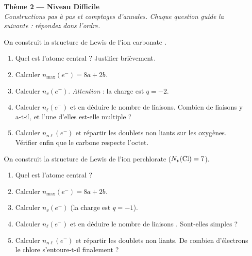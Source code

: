 \documentclass[11pt,a4paper]{article}
\newcommand{\nmax}{n_{\max}(e^-)}
\newcommand{\nv}{n_{v}(e^-)}
\newcommand{\nl}{n_{\ell}(e^-)}
\newcommand{\nnl}{n_{n\ell}(e^-)}
\begin{document}
\begin{center}
{\Large\bfseries\color{primarydark}Thème 2 — Niveau Difficile}\\[2pt]
{\small\itshape Constructions pas à pas et comptages d'annales. Chaque question guide la
suivante : répondez dans l'ordre.}
\end{center}
\medskip

\begin{exo}
On construit la structure de Lewis de l'ion carbonate .
\begin{enumerate}[label=\alph*),leftmargin=2em,itemsep=2pt]
  \item Quel est l'atome central ? Justifier brièvement.
  \item Calculer $\nmax = 8a + 2b$.
  \item Calculer $\nv$. \emph{Attention} : la charge est $q = -2$.
  \item Calculer $\nl$ et en déduire le nombre de liaisons. Combien de liaisons 
        y a-t-il, et l'une d'elles est-elle multiple ?
  \item Calculer $\nnl$ et répartir les doublets non liants sur les oxygènes. Vérifier enfin
        que le carbone respecte l'octet.
\end{enumerate}
\end{exo}

\begin{exo}
On construit la structure de Lewis de l'ion perchlorate  ($N_v(\ce{Cl}) = 7$).
\begin{enumerate}[label=\alph*),leftmargin=2em,itemsep=2pt]
  \item Quel est l'atome central ?
  \item Calculer $\nmax = 8a + 2b$.
  \item Calculer $\nv$ (la charge est $q = -1$).
  \item Calculer $\nl$ et en déduire le nombre de liaisons . Sont-elles simples ?
  \item Calculer $\nnl$ et répartir les doublets non liants. De combien d'électrons le chlore
        s'entoure-t-il finalement ?
\end{enumerate}
\end{exo}
\end{document}
